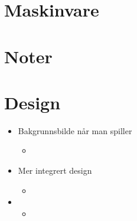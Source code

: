 \section{Maskinvare}



\section{Noter}

\section{Design}
\begin{itemize}

\item{Bakgrunnsbilde når man spiller}
\begin{itemize}
\item{}
\end{itemize}

\item{Mer integrert design}
\begin{itemize}
\item{}
\end{itemize}

\item{}
\begin{itemize}
\item{}
\end{itemize}

\end{itemize}